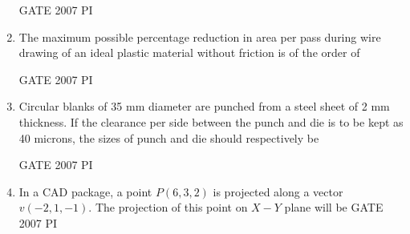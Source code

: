 \documentclass[journal,12pt,onecolumn]{IEEEtran}
\theoremstyle{remark}
\begin{document}
\begin{enumerate}
   \hfill{GATE 2007 PI}
   \begin{enumerate}
\end{enumerate}

\item
The maximum possible percentage reduction in area per pass during wire drawing of an ideal plastic material without friction is of the order of

\hfill{GATE 2007 PI}
\begin{enumerate}
\end{enumerate}

\item 
Circular blanks of 35 mm diameter are punched from a steel sheet of 2 mm thickness. If the clearance per side between the punch and die is to be kept as 40 microns, the sizes of punch and die should respectively be

\hfill{GATE 2007 PI }
\begin{enumerate}
\end{enumerate}

\item
In a CAD package, a point $P(6, 3, 2)$ is projected along a vector $v(-2,1,-1 )$. The projection of this point on $X-Y$ plane will be
\hfill{GATE 2007 PI}
\begin{enumerate}
\end{enumerate}


\end{enumerate}
\end{document}
